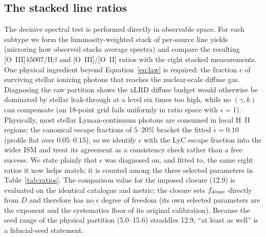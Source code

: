 \documentclass[twocolumn]{aastex631}
\begin{document}
\subsection{The stacked line ratios}\label{sec:spectra}
The decisive spectral test is performed directly in observable space. For
each subtype we form the luminosity-weighted stack of per-source line
yields (mirroring how observed stacks average spectra) and compare the
resulting [O~III]$\lambda5007$/H$\beta$ and [O~III]/[O~II] ratios with the
eight stacked measurements. One physical ingredient beyond
Equation~\ref{eq:law} is required: the fraction $\epsilon$ of surviving
stellar ionizing photons that reaches the nuclear-scale diffuse gas.
Diagnosing the raw partition shows the xLRD diffuse budget would otherwise
be dominated by stellar leak-through at a level six times too high, while
no $(\gamma,k)$ can compensate (an 18-point grid fails uniformly in ratio
space with $\epsilon=1$). Physically, most stellar Lyman-continuum photons
are consumed in local H~II regions; the canonical escape fractions of
$5$--$20$\% \citep[e.g.,][]{Flury2022} bracket the fitted
$\epsilon=0.10$ (profile flat over $0.05$--$0.15$), so we identify
$\epsilon$ with the LyC escape fraction into the wider ISM and treat its
agreement as a consistency check rather than a free success. We state
plainly that $\epsilon$ was diagnosed on, and fitted to, the same eight
ratios it now helps match; it is counted among the three selected
parameters in Table~\ref{tab:ratios}. The comparison value for the
imposed closure (12.9) is evaluated on the identical catalogue and
metric; the closure sets $f_{\rm dense}$ directly from $D$ and therefore
has no $\epsilon$ degree of freedom (its own selected parameters are the
exponent and the systematics floor of its original calibration). Because
the seed range of the physical partition (5.0--15.6) straddles 12.9,
``at least as well'' is a fiducial-seed statement.
\end{document}
